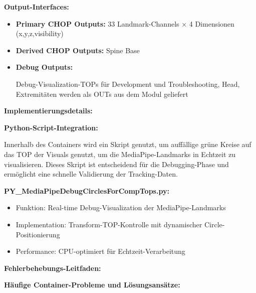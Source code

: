 \textbf{Output-Interfaces:}
\begin{itemize}
    \item \textbf{Primary CHOP Outputs:} 33 Landmark-Channels × 4 Dimensionen (x,y,z,visibility)
    \item \textbf{Derived CHOP Outputs:} Spine Base
    \item \textbf{Debug Outputs:} \raggedright Debug-Visualization-TOPs für Development und Troubleshooting, Head, Extremitäten werden als OUTs aus dem Modul geliefert
\end{itemize}

\textbf{Implementierungsdetails:}

\textbf{Python-Script-Integration:}

\raggedright Innerhalb des Containers wird ein Skript genutzt, um auffällige grüne Kreise auf das TOP der Visuals genutzt, um die MediaPipe-Landmarks in Echtzeit zu visualisieren. Dieses Skript ist entscheidend für die Debugging-Phase und ermöglicht eine schnelle Validierung der Tracking-Daten.

\textbf{PY\_MediaPipeDebugCirclesForCompTops.py:}
\begin{itemize}
    \item Funktion: Real-time Debug-Visualization der MediaPipe-Landmarks
    \item Implementation: Transform-TOP-Kontrolle mit dynamischer Circle-Positionierung
    \item Performance: CPU-optimiert für Echtzeit-Verarbeitung
\end{itemize}

\textbf{Fehlerbehebungs-Leitfaden:}

\textbf{Häufige Container-Probleme und Lösungsansätze:}


